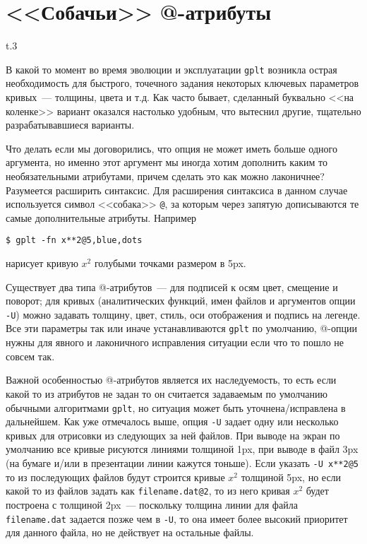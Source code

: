 \documentclass[12pt]{article}
\def\gplt{{\tt gplt}}
\begin{document}
\section{<<Собачьи>> @-атрибуты}
\begin{wrapfigure}[5]{t}{.3\textwidth}
  \vphantom{.}
  \vspace{-2cm}

\end{wrapfigure}
В какой то момент во время эволюции и эксплуатации \verb'gplt' возникла острая необходимость для быстрого, точечного задания некоторых ключевых
параметров кривых~--- толщины, цвета и т.д. Как часто бывает, сделанный буквально <<на коленке>> вариант
оказался настолько удобным, что вытеснил другие, тщательно разрабатывавшиеся варианты. 

Что делать если мы договорились, что опция не может иметь больше одного аргумента, но именно этот аргумент мы иногда хотим дополнить каким то необязательными атрибутами,
причем сделать это как можно лаконичнее?
Разумеется расширить синтаксис. Для расширения синтаксиса в данном случае используется символ <<собака>> \verb'@', за которым через запятую дописываются те самые
дополнительные атрибуты. Например
\begin{verbatim}
$ gplt -fn x**2@5,blue,dots
\end{verbatim}
нарисует кривую $x^2$ голубыми точками размером в 5px.

Существует два типа @-атрибутов~--- для подписей к осям цвет, смещение и поворот; для кривых (аналитических функций,
имен файлов и аргументов опции \verb'-U') можно задавать толщину, цвет, стиль, оси отображения и подпись на легенде.
Все эти параметры так или иначе устанавливаются \gplt{} по умолчанию, @-опции нужны для явного и лаконичного исправления ситуации если что то пошло не совсем так. 

Важной особенностью @-атрибутов является их наследуемость, то есть если какой то из атрибутов не задан то он считается задаваемым по умолчанию
обычными алгоритмами \gplt, но ситуация может быть уточнена/исправлена в дальнейшем.
Как уже отмечалось выше, опция \verb'-U' задает одну или несколько кривых для отрисовки из следующих за ней файлов. При выводе на экран по умолчанию
все кривые рисуются линиями толщиной 1px, при выводе в файл 3px (на бумаге и/или в презентации линии кажутся тоньше).
Если указать \verb'-U x**2@5' то из последующих файлов будут строится кривые $x^2$ толщиной 5px, но если какой то из файлов задать как
\verb'filename.dat@2', то из него кривая $x^2$ будет построена с толщиной 2px~--- поскольку толщина линии для файла \verb'filename.dat' задается позже чем в \verb'-U',
то она имеет более высокий приоритет для данного файла, но не действует на остальные файлы. 
\end{document}
